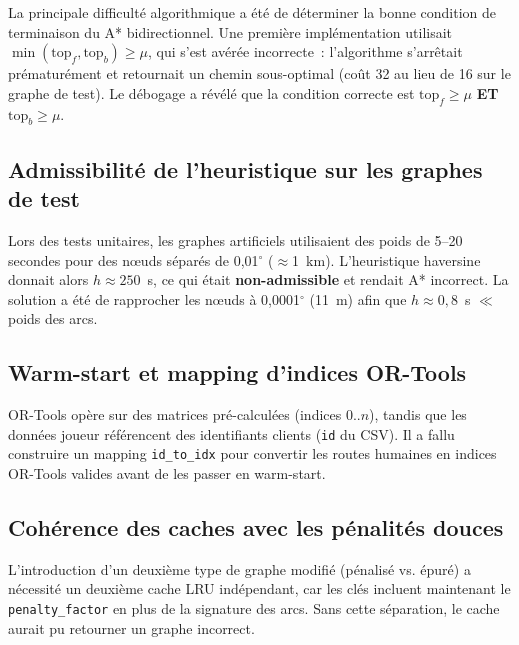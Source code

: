 \documentclass[a4paper, 12pt, twoside]{article}
\begin{document}
La principale difficult\'{e} algorithmique a \'{e}t\'{e} de d\'{e}terminer la bonne condition de terminaison du A* bidirectionnel. Une premi\`{e}re impl\'{e}mentation utilisait $\min(\text{top}_f, \text{top}_b) \geq \mu$, qui s'est av\'{e}r\'{e}e incorrecte~: l'algorithme s'arr\^{e}tait pr\'{e}matur\'{e}ment et retournait un chemin sous-optimal (co\^{u}t 32 au lieu de 16 sur le graphe de test). Le d\'{e}bogage a r\'{e}v\'{e}l\'{e} que la condition correcte est $\text{top}_f \geq \mu$ \textbf{ET} $\text{top}_b \geq \mu$.

\subsection{Admissibilit\'{e} de l'heuristique sur les graphes de test}

Lors des tests unitaires, les graphes artificiels utilisaient des poids de 5--20 secondes pour des n\oe uds s\'{e}par\'{e}s de 0,01$^\circ$ ($\approx$1~km). L'heuristique haversine donnait alors $h \approx 250$~s, ce qui \'{e}tait \textbf{non-admissible} et rendait A* incorrect. La solution a \'{e}t\'{e} de rapprocher les n\oe uds \`{a} 0,0001$^\circ$ (11~m) afin que $h \approx 0{,}8$~s $\ll$ poids des arcs.

\subsection{Warm-start et mapping d'indices OR-Tools}

OR-Tools op\`{e}re sur des matrices pr\'{e}-calcul\'{e}es (indices 0..$n$), tandis que les donn\'{e}es joueur r\'{e}f\'{e}rencent des identifiants clients (\texttt{id} du CSV). Il a fallu construire un mapping \texttt{id\_to\_idx} pour convertir les routes humaines en indices OR-Tools valides avant de les passer en warm-start.

\subsection{Coh\'{e}rence des caches avec les p\'{e}nalit\'{e}s douces}

L'introduction d'un deuxi\`{e}me type de graphe modifi\'{e} (p\'{e}nalis\'{e} vs. \'{e}pur\'{e}) a n\'{e}cessit\'{e} un deuxi\`{e}me cache LRU ind\'{e}pendant, car les cl\'{e}s incluent maintenant le \texttt{penalty\_factor} en plus de la signature des arcs. Sans cette s\'{e}paration, le cache aurait pu retourner un graphe incorrect.

\end{document}
